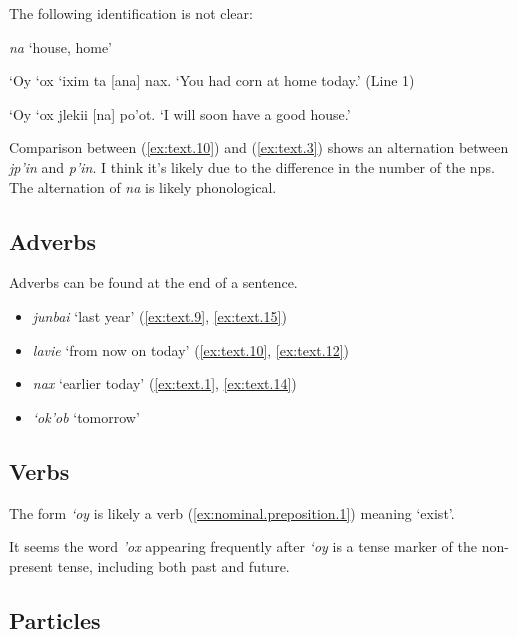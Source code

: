 \documentclass[12pt]{article}
\newcommand*{\form}[1]{\emph{#1}}
\newcommand{\translate}[1]{`#1'}
\def\\{}%
\begin{document}
The following identification is not clear:
\begin{exe}
    \ex \form{na} \translate{house, home} 
    \begin{xlist}
        \ex `Oy `ox `ixim ta [ana] nax. \\
        \translate{You had corn at home today.} (Line 1)
        
        \ex `Oy `ox jlekii [na] po'ot. \\
        \translate{I will soon have a good house.}
    \end{xlist}
\end{exe}
Comparison between (\ref{ex:text.10}) and (\ref{ex:text.3}) shows
an alternation between \form{jp'in} and \form{p'in}.
I think it's likely due to the difference in the number of the \acp{np}. 
The alternation of \form{na} is likely phonological.

\subsection{Adverbs}

Adverbs can be found at the end of a sentence.

\begin{itemize}
    \item \form{junbai} \translate{last year} (\ref{ex:text.9}, \ref{ex:text.15})

    \item \form{lavie} \translate{from now on today} (\ref{ex:text.10}, \ref{ex:text.12})
    
    \item \form{nax} \translate{earlier today} (\ref{ex:text.1}, \ref{ex:text.14})

    \item \form{`ok'ob} \translate{tomorrow} 
\end{itemize}

\subsection{Verbs} 

The form \form{`oy} is likely a verb (\ref{ex:nominal.preposition.1})
meaning \translate{exist}.

It seems the word \form{'ox} appearing frequently after \form{`oy} 
is a tense marker of the non-present tense,
including both past and future.

\subsection{Particles}
\end{document}
